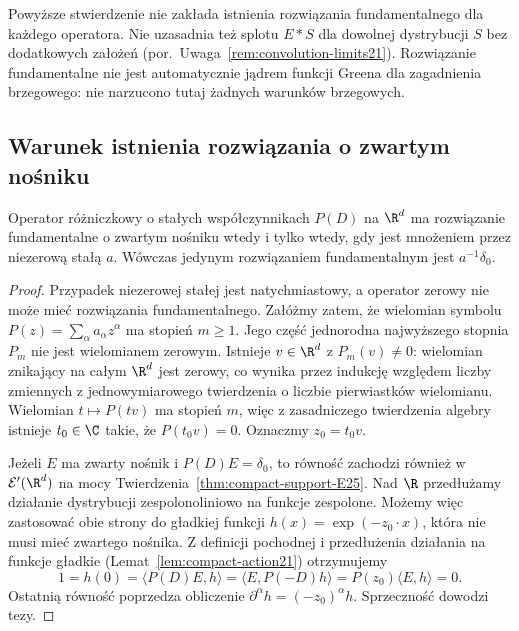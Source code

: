 \begin{uwaga}
Powyższe stwierdzenie nie zakłada istnienia
rozwiązania fundamentalnego dla każdego operatora.
Nie uzasadnia też splotu $E*S$ dla dowolnej
dystrybucji $S$ bez dodatkowych założeń
(por.~Uwaga~\ref{rem:convolution-limits21}).
Rozwiązanie fundamentalne nie jest automatycznie
jądrem funkcji Greena dla zagadnienia brzegowego:
nie narzucono tutaj żadnych warunków brzegowych.
\end{uwaga}

\subsection{Warunek istnienia rozwiązania o zwartym nośniku}

\begin{twierdzenie}
\label{thm:dt-fundamental-compact}
Operator różniczkowy o stałych współczynnikach $P(D)$
na $\R^d$ ma rozwiązanie fundamentalne o zwartym
nośniku wtedy i tylko wtedy, gdy jest mnożeniem
przez niezerową stałą $a$. Wówczas jedynym
rozwiązaniem fundamentalnym jest $a^{-1}\delta_0$.
\end{twierdzenie}
\begin{proof}
Przypadek niezerowej stałej jest natychmiastowy,
a operator zerowy nie może mieć rozwiązania fundamentalnego.
Załóżmy zatem, że wielomian symbolu
$P(z)=\sum_\alpha a_\alpha z^\alpha$ ma stopień $m\ge1$.
Jego część jednorodna najwyższego stopnia $P_m$
nie jest wielomianem zerowym. Istnieje $v\in\R^d$
z $P_m(v)\ne0$: wielomian znikający na całym
$\R^d$ jest zerowy, co wynika przez indukcję
względem liczby zmiennych z jednowymiarowego
twierdzenia o liczbie pierwiastków wielomianu.
Wielomian $t\mapsto P(tv)$ ma stopień $m$, więc
z zasadniczego twierdzenia algebry istnieje
$t_0\in\C$ takie, że $P(t_0v)=0$.
Oznaczmy $z_0=t_0v$.

Jeżeli $E$ ma zwarty nośnik i $P(D)E=\delta_0$,
to równość zachodzi również w $\mathcal E'(\R^d)$
na mocy Twierdzenia~\ref{thm:compact-support-E25}.
Nad $\R$ przedłużamy działanie dystrybucji
zespolonoliniowo na funkcje zespolone.
Możemy więc zastosować obie strony do gładkiej
funkcji $h(x)=\exp(-z_0\cdot x)$, która nie musi
mieć zwartego nośnika. Z definicji pochodnej
i przedłużenia działania na funkcje gładkie
(Lemat~\ref{lem:compact-action21}) otrzymujemy
\[
 1=h(0)=\langle P(D)E,h\rangle
 =\langle E,P(-D)h\rangle
 =P(z_0)\langle E,h\rangle=0.
\]
Ostatnią równość poprzedza obliczenie
$\partial^\alpha h=(-z_0)^\alpha h$.
Sprzeczność dowodzi tezy.
\end{proof}

